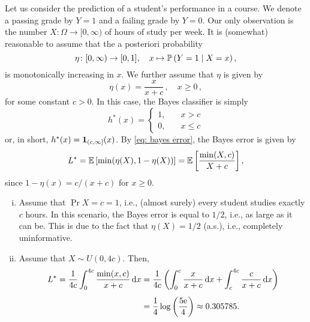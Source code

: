 \begin{example}
Let us consider the prediction of a student's performance in a course. We denote a passing grade by $Y=1$ and a failing grade by $Y=0$. Our only observation is the number $X \colon \Omega \to [0, \infty)$ of hours of study per week. It is (somewhat) reasonable to assume that the a posteriori probability
\[
    \eta \colon [0, \infty) \to [0, 1], \quad x \mapsto \mathbb{P}\left(Y = 1 \mathrel{|} X = x\right),
\]
is monotonically increasing in $x$. We further assume that $\eta$ is given by
\[
    \eta(x) = \frac{x}{x + c} \, , \quad x \geq 0 \, ,
\]
for some constant $c > 0$. In this case, the Bayes classifier is simply
\[
    h^*(x) = \begin{cases}
        1, \quad &x > c \\
        0, \quad &x \leq c
    \end{cases}
\]
or, in short, $h^*(x) = \mathbf{1}_{(c, \infty]}(x)$. By \eqref{eq: bayes error}, the Bayes error is given by
\[
    L^* = \mathbb{E}\left[\min(\eta(X), 1-\eta(X))\right] = \mathbb{E}\left[\frac{\min(X, c)}{X + c}\right],
\]
since $1 - \eta(x) = c / (x+c)$ for $x \geq 0$.

\begin{enumerate}[(i)]
    \item Assume that $\Pr{X = c} = 1$, i.e., (almost surely) every student studies exactly $c$ hours. In this scenario, the Bayes error is equal to $1/2$, i.e., as large as it can be. This is due to the fact that $\eta(X) = 1/2$ (a.s.), i.e., completely uninformative.
    
    \item Assume that $X \sim U(0, 4c)$. Then,
    \begin{align*}
        L^* = \frac{1}{4c} \int_0^{4c} \frac{\min(x, c)}{x + c} \,\mathrm{d}x &= \frac{1}{4c} \left( \int_0^c \frac{x}{x + c} \,\mathrm{d}x + \int_c^{4c} \frac{c}{x + c} \,\mathrm{d}x \right) \\[4pt]
            &= \frac{1}{4} \log\left(\frac{5\mathrm{e}}{4}\right) \approx 0.305785.
    \end{align*}
\end{enumerate}
\end{example}

